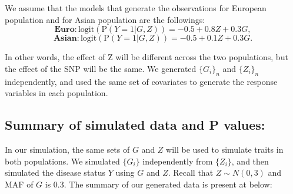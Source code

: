 \documentclass[
]{article}
\begin{document}
We assume that the models that generate the observations for European
population and for Asian population are the followings:
\[\textbf{Euro}:\text{logit}(\text{P}(Y=1|G,Z)) = -0.5 + 0.8Z + 0.3G,\]
\[\textbf{Asian}: \text{logit}(\text{P}(Y=1|G,Z)) = -0.5 + 0.1Z + 0.3G.\]

In other words, the effect of Z will be different across the two
populations, but the effect of the SNP will be the same. We generated
\(\{G_i\}_n\) and \(\{Z_i\}_n\) independently, and used the same set of
covariates to generate the response variables in each population.

\hypertarget{summary-of-simulated-data-and-p-values}{%
\subsection{Summary of simulated data and P
values:}\label{summary-of-simulated-data-and-p-values}}

In our simulation, the same sets of \(G\) and \(Z\) will be used to
simulate traits in both populations. We simulated \(\{G_i\}\)
independently from \(\{Z_i\}\), and then simulated the disease status
\(Y\) using \(G\) and \(Z\). Recall that \(Z \sim N(0,3)\) and MAF of
\(G\) is 0.3. The summary of our generated data is present at below:
\end{document}
